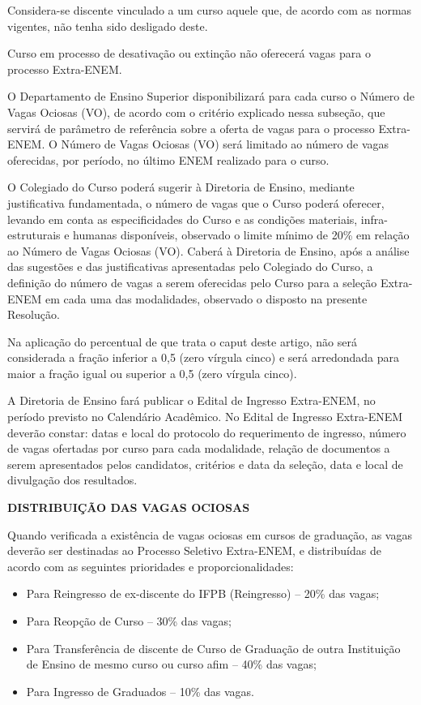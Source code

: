 	Considera-se discente vinculado a um curso aquele que, de acordo com as normas vigentes, não tenha sido desligado deste.

	Curso em processo de desativação ou extinção não oferecerá vagas para o processo Extra-ENEM.

	O Departamento de Ensino Superior disponibilizará para cada curso o Número de Vagas Ociosas (VO), de acordo com o critério explicado nessa subseção, que servirá de parâmetro de referência sobre a oferta de vagas para o processo Extra-ENEM. O Número de Vagas Ociosas (VO) será limitado ao número de vagas oferecidas, por período, no último ENEM realizado para o curso.

	O Colegiado do Curso poderá sugerir à Diretoria de Ensino, mediante justificativa fundamentada, o número de vagas que o Curso poderá oferecer, levando em conta as especificidades do Curso e as condições materiais, infra-estruturais e humanas disponíveis, observado o limite mínimo de 20\% em relação ao Número de Vagas Ociosas (VO). Caberá à Diretoria de Ensino, após a análise das sugestões e das justificativas apresentadas pelo Colegiado do Curso, a definição do número de vagas a serem oferecidas pelo Curso para a seleção Extra-ENEM em cada uma das modalidades, observado o disposto na presente Resolução.

	Na aplicação do percentual de que trata o caput deste artigo, não será considerada a fração inferior a 0,5 (zero vírgula cinco) e será arredondada para maior a fração igual ou superior a 0,5 (zero vírgula cinco).

	A Diretoria de Ensino fará publicar o Edital de Ingresso Extra-ENEM, no período previsto no Calendário Acadêmico. No Edital de Ingresso Extra-ENEM deverão constar: datas e local do protocolo do requerimento de ingresso, número de vagas ofertadas por curso para cada modalidade, relação de documentos a serem apresentados pelos candidatos, critérios e data da seleção, data e local de divulgação dos resultados.

\vspace{4mm}
\textbf{DISTRIBUIÇÃO DAS VAGAS OCIOSAS}
\vspace{4mm}

	Quando verificada a existência de vagas ociosas em cursos de graduação, as vagas deverão ser destinadas ao Processo Seletivo Extra-ENEM, e distribuídas de acordo com as seguintes prioridades e proporcionalidades:

\begin{itemize}
	\item Para Reingresso de ex-discente do IFPB (Reingresso) – 20\% das vagas;
	\item Para Reopção de Curso – 30\% das vagas;
	\item Para Transferência de discente de Curso de Graduação de outra Instituição de Ensino de mesmo curso ou curso afim – 40\% das vagas;
	\item Para Ingresso de Graduados – 10\% das vagas.
\end{itemize}

